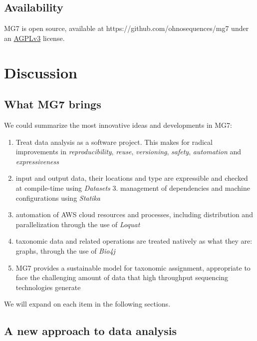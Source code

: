 \documentclass{frontiersSCNS} %
\providecommand{\tightlist}{%
\setlength{\itemsep}{0pt}\setlength{\parskip}{0pt}}
\begin{document}
\subsection{Availability}\label{availability}

MG7 is open source, available at https://github.com/ohnosequences/mg7
under an \href{http://www.gnu.org/licenses/agpl-3.0.en.html}{AGPLv3}
license.

\section{Discussion}\label{discussion}

\subsection{What MG7 brings}\label{what-mg7-brings}

We could summarize the most innovative ideas and developments in MG7:

\begin{enumerate}
\def\labelenumi{\arabic{enumi}.}
\tightlist
\item
  Treat data analysis as a software project. This makes for radical
  improvements in \emph{reproducibility}, \emph{reuse},
  \emph{versioning}, \emph{safety}, \emph{automation} and
  \emph{expressiveness}
\item
  input and output data, their locations and type are expressible and
  checked at compile-time using \emph{Datasets} ­3. management of
  dependencies and machine configurations using \emph{Statika}
\item
  automation of AWS cloud resources and processes, including
  distribution and parallelization through the use of \emph{Loquat}
\item
  taxonomic data and related operations are treated natively as what
  they are: graphs, through the use of \emph{Bio4j}
\item
  MG7 provides a sustainable model for taxonomic assignment, appropriate
  to face the challenging amount of data that high throughput sequencing
  technologies generate
\end{enumerate}

We will expand on each item in the following sections.

\subsection{A new approach to data
analysis}\label{a-new-approach-to-data-analysis}
\end{document}
